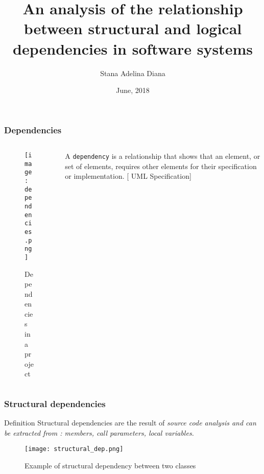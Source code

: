 \documentclass{beamer}
\title[Pres]{An analysis of the relationship between structural and logical\\ dependencies in software systems }
\author{Stana Adelina Diana}
\institute{Computer Science and Engineering Department\\
"Politehnica" University of Timisoara}
\date{June, 2018}
\begin{document}
\begin{frame}
  \titlepage
\end{frame}

 \begin{frame}
\frametitle{Dependencies}
\begin{columns}
\begin{column}{0.5\textwidth}
    \begin{center}
     \begin{figure}
	\texttt{[image: dependencies.png]}
	\caption{\label{fig:your-figure}Dependencies in a project}
     \end{figure}
     \end{center}
\end{column}
\begin{column}{0.5\textwidth}

A  \texttt{dependency} is a relationship that shows that an element, or set of elements, requires other elements for their specification or implementation. [ UML Specification]

\end{column}
\end{columns}
\end{frame}

 \begin{frame}
\frametitle{Structural dependencies}
\begin{block}{Definition}
Structural dependencies are the result of \it{source code analysis} and can be extracted from : members, call parameters, local variables. 
\end{block}

\begin{center}
     \begin{figure}
	\texttt{[image: structural\_dep.png]}
	\caption{\label{fig:fig}Example of structural dependency between two classes}
     \end{figure}
\end{center}

\end{frame}

\end{document}
